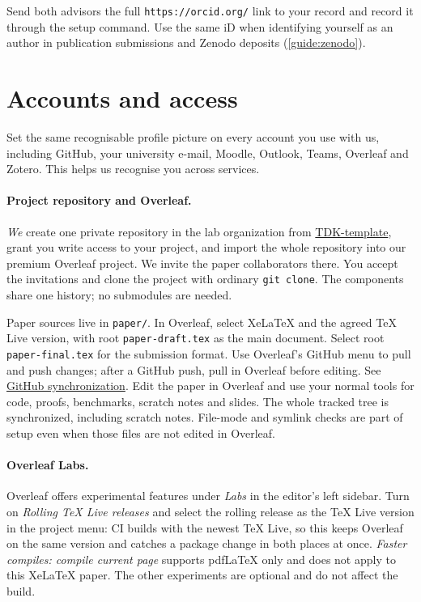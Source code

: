 Send both advisors the full \texttt{https://orcid.org/} link to your record and record it through the setup command. Use the same iD when identifying yourself as an author in publication submissions and Zenodo deposits (\cref{guide:zenodo}).

\section{Accounts and access}\label{guide:start:access}
Set the same recognisable profile picture on every account you use with us, including GitHub, your university e-mail, Moodle, Outlook, Teams, Overleaf and Zotero. This helps us recognise you across services.

\paragraph{Project repository and Overleaf.} \emph{We} create one private repository in the lab organization from \href{https://github.com/FTSRG-BCLab-TDK/TDK-template}{TDK-template}, grant you write access to your project, and import the whole repository into our premium Overleaf project. We invite the paper collaborators there. You accept the invitations and clone the project with ordinary \texttt{git clone}. The components share one history; no submodules are needed.

Paper sources live in \texttt{paper/}. In Overleaf, select XeLaTeX and the agreed TeX Live version, with root \texttt{paper-draft.tex} as the main document. Select root \texttt{paper-final.tex} for the submission format. Use Overleaf's GitHub menu to pull and push changes; after a GitHub push, pull in Overleaf before editing. See \href{https://docs.overleaf.com/integrations-and-add-ons/git-integration-and-github-synchronization/github-synchronization}{GitHub synchronization}. Edit the paper in Overleaf and use your normal tools for code, proofs, benchmarks, scratch notes and slides. The whole tracked tree is synchronized, including scratch notes. File-mode and symlink checks are part of setup even when those files are not edited in Overleaf.

\paragraph{Overleaf Labs.} Overleaf offers experimental features under \emph{Labs} in the editor's left sidebar. Turn on \emph{Rolling TeX Live releases} and select the rolling release as the TeX Live version in the project menu: CI builds with the newest TeX Live, so this keeps Overleaf on the same version and catches a package change in both places at once. \emph{Faster compiles: compile current page} supports pdf\LaTeX{} only and does not apply to this XeLaTeX paper. The other experiments are optional and do not affect the build.

